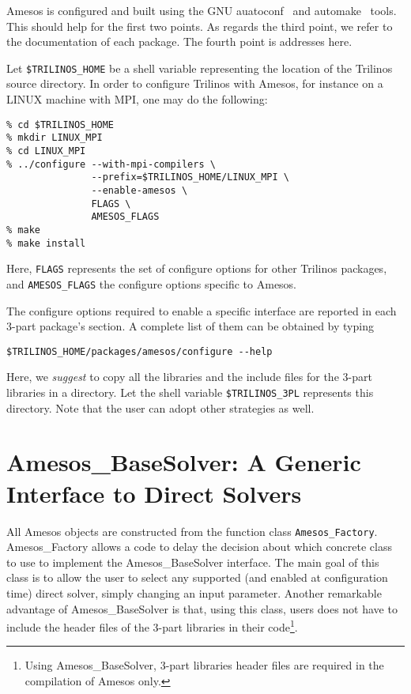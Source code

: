 \documentclass[11pt]{SANDreport}
\begin{document}
Amesos is configured and built using the GNU auatoconf~\cite{Autoconf}
and automake~\cite{Automake} tools. This should help for the first two
points. As regards the third point, we refer to the documentation of
each package. The fourth point is addresses here.

Let \verb!$TRILINOS_HOME! be a shell variable representing the location
of the Trilinos source directory.  In order to configure Trilinos with
Amesos, for instance on a LINUX machine with MPI, one may do the following:
\begin{verbatim}
% cd $TRILINOS_HOME
% mkdir LINUX_MPI
% cd LINUX_MPI
% ../configure --with-mpi-compilers \
               --prefix=$TRILINOS_HOME/LINUX_MPI \
               --enable-amesos \
               FLAGS \
               AMESOS_FLAGS
% make
% make install
\end{verbatim}
Here, \verb!FLAGS! represents the set of configure options for other
Trilinos packages, and \verb!AMESOS_FLAGS! the configure options
specific to Amesos. 

The configure options required to enable a specific interface are
reported in each 3-part package's section. A complete list of them can
be obtained by typing
\begin{verbatim}
$TRILINOS_HOME/packages/amesos/configure --help
\end{verbatim}
Here, we {\sl suggest} to copy all the libraries and the include files
for the 3-part libraries in a directory. Let the shell variable
\verb!$TRILINOS_3PL! represents this directory. Note that the user can
adopt other strategies as well.


\section{Amesos\_BaseSolver: A Generic Interface to Direct Solvers}
\label{sec:amesos_generic}

All Amesos objects are constructed from the function class
\verb!Amesos_Factory!.  Amesos\_Factory allows a code to delay the
decision about which concrete class to use to implement the
Amesos\_BaseSolver interface. The main goal of this class is to allow
the user to select any supported (and enabled at configuration time)
direct solver, simply changing an input parameter. Another remarkable
advantage of Amesos\_BaseSolver is that, using this class, users does
not have to include the header files of the 3-part libraries in their
code\footnote{Using Amesos\_BaseSolver, 3-part libraries header files
  are required in the compilation of Amesos only.}.
\end{document}
